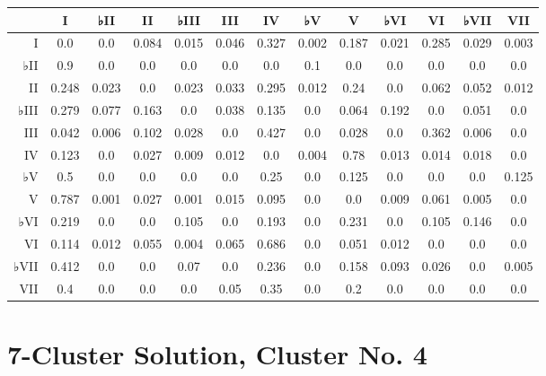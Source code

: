 \begin{table}[htbp]
\begin{minipage}{\linewidth}
\setlength{\tymax}{0.5\linewidth}
\centering
\small
\begin{tabulary}{\textwidth}{@{}RCCCCCCCCCCCC@{}} \toprule
&I&♭II&II&♭III&III&IV&♭V&V&♭VI&VI&♭VII&VII\\
\midrule
I&0.0&0.0&0.084&0.015&0.046&0.327&0.002&0.187&0.021&0.285&0.029&0.003\\
♭II&0.9&0.0&0.0&0.0&0.0&0.0&0.1&0.0&0.0&0.0&0.0&0.0\\
II&0.248&0.023&0.0&0.023&0.033&0.295&0.012&0.24&0.0&0.062&0.052&0.012\\
♭III&0.279&0.077&0.163&0.0&0.038&0.135&0.0&0.064&0.192&0.0&0.051&0.0\\
III&0.042&0.006&0.102&0.028&0.0&0.427&0.0&0.028&0.0&0.362&0.006&0.0\\
IV&0.123&0.0&0.027&0.009&0.012&0.0&0.004&0.78&0.013&0.014&0.018&0.0\\
♭V&0.5&0.0&0.0&0.0&0.0&0.25&0.0&0.125&0.0&0.0&0.0&0.125\\
V&0.787&0.001&0.027&0.001&0.015&0.095&0.0&0.0&0.009&0.061&0.005&0.0\\
♭VI&0.219&0.0&0.0&0.105&0.0&0.193&0.0&0.231&0.0&0.105&0.146&0.0\\
VI&0.114&0.012&0.055&0.004&0.065&0.686&0.0&0.051&0.012&0.0&0.0&0.0\\
♭VII&0.412&0.0&0.0&0.07&0.0&0.236&0.0&0.158&0.093&0.026&0.0&0.005\\
VII&0.4&0.0&0.0&0.0&0.05&0.35&0.0&0.2&0.0&0.0&0.0&0.0\\

\bottomrule

\end{tabulary}
\end{minipage}
\end{table}

\section{7-Cluster Solution, Cluster No. 4}
\label{7-clustersolutionclusterno.4}

